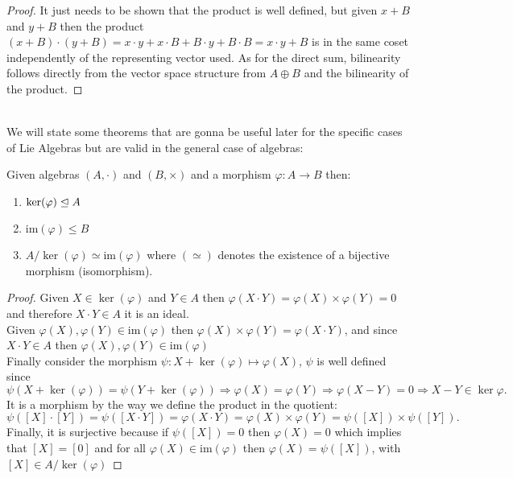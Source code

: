 \begin{proof}
	It just needs to be shown that the product is well defined, but given $x+B$ and $y+B$ then the product $(x+B)\cdot(y+B)=x\cdot y + x\cdot B + B\cdot y + B\cdot B = x\cdot y+B$ is in the same coset independently of the representing vector used. As for the direct sum, bilinearity follows directly from the vector space structure from $A\oplus B$ and the bilinearity of the product.
\end{proof}\\
We will state some theorems that are gonna be useful later for the specific cases of Lie Algebras but are valid in the general case of algebras:\\
\begin{prop}
Given algebras $(A,\cdot)$ and $(B,\times)$ and a morphism $\varphi:A\rightarrow B$ then: 
\begin{enumerate}[label=\alph*.]
	\item $\ker(\varphi) \trianglelefteq A$
	\item $\text{im}(\varphi) \le B$ 
	\item $A/\ker(\varphi) \simeq \text{im}(\varphi)$ where $(\simeq)$ denotes the existence of a bijective morphism (isomorphism).
\end{enumerate}	
\label{12isomorphism}
\end{prop}
\begin{proof}
	Given $X \in \ker(\varphi)$ and $Y \in A$ then $\varphi(X \cdot Y) = \varphi(X)\times \varphi(Y) = 0$ and therefore $X\cdot Y \in A$ it is an ideal.\\
	Given $\varphi(X),\varphi(Y) \in \text{im}(\varphi)$ then $\varphi(X) \times \varphi(Y) = \varphi(X\cdot Y)$, and since $X \cdot Y \in A$ then $\varphi(X),\varphi(Y) \in \text{im}(\varphi)$\\
	Finally consider the morphism $\psi: X+\ker(\varphi) \mapsto \varphi(X)$, $\psi$ is well defined since $$\psi(X+\ker(\varphi))=\psi(Y+\ker(\varphi)) \Rightarrow \varphi(X)=\varphi(Y) \Rightarrow \varphi(X-Y)=0 \Rightarrow X-Y \in \ker\varphi.$$
	It is a morphism by the way we define the product in the quotient: $$\psi([X]\cdot[Y]) = \psi([X \cdot Y]) = \varphi(X \cdot Y) = \varphi(X)\times \varphi(Y) = \psi([X])\times \psi([Y]).$$
	Finally, it is surjective because if $\psi([X])=0$ then $\varphi(X)=0$ which implies that $[X]=[0]$ and for all $\varphi(X) \in \text{im}(\varphi)$ then $\varphi(X) = \psi([X])$, with $[X] \in A/\ker(\varphi)$
\end{proof}\\
